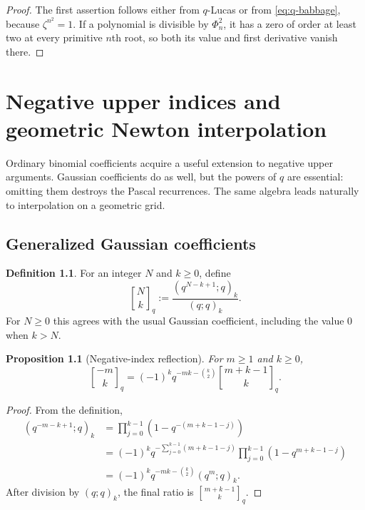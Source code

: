 \documentclass[11pt,oneside,openany]{book}
\newtheorem{proposition}[theorem]{Proposition}
\theoremstyle{definition}
\newtheorem{definition}[theorem]{Definition}
\theoremstyle{remark}
\newcommand{\Qbinom}[3]{\genfrac{[}{]}{0pt}{}{#1}{#2}_{#3}}
\begin{document}
\begin{proof}
The first assertion follows either from $q$-Lucas or from \eqref{eq:q-babbage}, because $\zeta^{n^2}=1$.  If a polynomial is divisible by $\Phi_n^2$, it has a zero of order at least two at every primitive $n$th root, so both its value and first derivative vanish there.
\end{proof}

\chapter{Negative upper indices and geometric Newton interpolation}\label{chap:qnewton}

Ordinary binomial coefficients acquire a useful extension to negative upper arguments.  Gaussian coefficients do as well, but the powers of $q$ are essential: omitting them destroys the Pascal recurrences.  The same algebra leads naturally to interpolation on a geometric grid.

\section{Generalized Gaussian coefficients}

\begin{definition}
For an integer $N$ and $k\ge0$, define
\[
 \Qbinom Nkq
 :=\frac{(q^{N-k+1};q)_k}{(q;q)_k}.
 \tag{17.1}\label{eq:generalized-gaussian}
\]
For $N\ge0$ this agrees with the usual Gaussian coefficient, including the value $0$ when $k>N$.
\end{definition}

\begin{proposition}[Negative-index reflection]\label{prop:negative-gaussian}
For $m\ge1$ and $k\ge0$,
\[
 \Qbinom{-m}{k}q
 =(-1)^kq^{-mk-\binom k2}
   \Qbinom{m+k-1}{k}q.
 \tag{17.2}\label{eq:negative-reflection}
\]
\end{proposition}

\begin{proof}
From the definition,
\begin{align*}
 (q^{-m-k+1};q)_k
 &=\prod_{j=0}^{k-1}\left(1-q^{-(m+k-1-j)}\right)\\
 &=(-1)^kq^{-\sum_{j=0}^{k-1}(m+k-1-j)}
   \prod_{j=0}^{k-1}(1-q^{m+k-1-j})\\
 &=(-1)^kq^{-mk-\binom k2}(q^m;q)_k.
\end{align*}
After division by $(q;q)_k$, the final ratio is $\Qbinom{m+k-1}{k}q$.
\end{proof}
\end{document}
